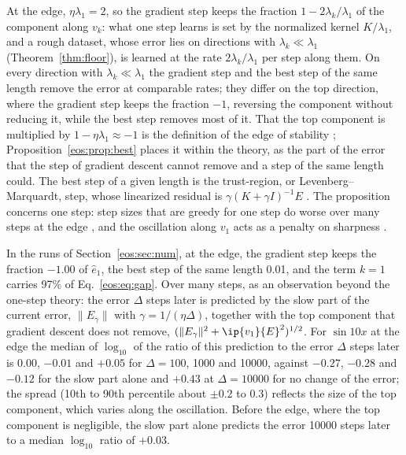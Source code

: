 At the edge, $\eta\lambda_1 = 2$, so the gradient step keeps the fraction $1 - 2\lambda_k/\lambda_1$ of the component along $v_k$: what one step learns is set by the normalized kernel $K/\lambda_1$, and a rough dataset, whose error lies on directions with $\lambda_k\ll\lambda_1$ (Theorem~\ref{thm:floor}), is learned at the rate $2\lambda_k/\lambda_1$ per step along them.
On every direction with $\lambda_k\ll\lambda_1$ the gradient step and the best step of the same length remove the error at comparable rates; they differ on the top direction, where the gradient step keeps the fraction $-1$, reversing the component without reducing it, while the best step removes most of it.
That the top component is multiplied by $1 - \eta\lambda_1\approx-1$ is the definition of the edge of stability \cite{cohen2021}; Proposition~\ref{eos:prop:best} places it within the theory, as the part of the error that the step of gradient descent cannot remove and a step of the same length could.
The best step of a given length is the trust-region, or Levenberg--Marquardt, step, whose linearized residual is $\gamma(K + \gamma I)^{-1}E$ \cite{hanke1997}.
The proposition concerns one step: step sizes that are greedy for one step do worse over many steps at the edge \cite{roulet2024}, and the oscillation along $v_1$ acts as a penalty on sharpness \cite{cohen2025}.

In the runs of Section~\ref{eos:sec:num}, at the edge, the gradient step keeps the fraction $-1.00$ of $\hat e_1$, the best step of the same length 0.01, and the term $k = 1$ carries 97\% of Eq.~\eqref{eos:eq:gap}.
Over many steps, as an observation beyond the one-step theory: the error $\Delta$ steps later is predicted by the slow part of the current error, $\|E_\gamma\|$ with $\gamma = 1/(\eta\Delta)$, together with the top component that gradient descent does not remove, $(\|E_\gamma\|^2 + \ip{v_1}{E}^2)^{1/2}$.
For $\sin10x$ at the edge the median of $\log_{10}$ of the ratio of this prediction to the error $\Delta$ steps later is $0.00$, $-0.01$ and $+0.05$ for $\Delta = 100$, 1000 and 10000, against $-0.27$, $-0.28$ and $-0.12$ for the slow part alone and $+0.43$ at $\Delta = 10000$ for no change of the error; the spread (10th to 90th percentile about $\pm0.2$ to $0.3$) reflects the size of the top component, which varies along the oscillation.
Before the edge, where the top component is negligible, the slow part alone predicts the error 10000 steps later to a median $\log_{10}$ ratio of $+0.03$.

